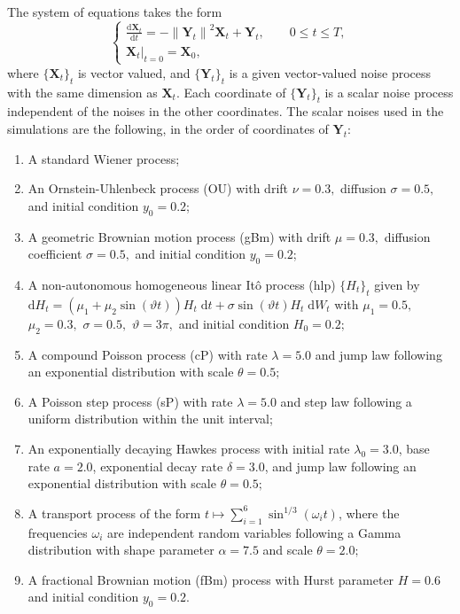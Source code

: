 \documentclass[reqno,12pt]{amsart}
\theoremstyle{plain} %
\theoremstyle{definition} %
\begin{document}
The system of equations takes the form
\begin{equation}
    \label{allnoisesRODEsystem}
    \begin{cases}
        \displaystyle \frac{\mathrm{d}\mathbf{X}_t}{\mathrm{d} t} = - \left\|\mathbf{Y}_t\right\|^2 \mathbf{X}_t + \mathbf{Y}_t, \qquad 0 \leq t \leq T, \\
        \left. \mathbf{X}_t \right|_{t = 0} = \mathbf{X}_0,
    \end{cases}
\end{equation}
where $\{\mathbf{X}_t\}_t$ is vector valued, and $\{\mathbf{Y}_t\}_t$ is a given vector-valued noise process with the same dimension as $\mathbf{X}_t$. Each coordinate of $\{\mathbf{Y}_t\}_t$ is a scalar noise process independent of the noises in the other coordinates. The scalar noises used in the simulations are the following, in the order of coordinates of $\mathbf{Y}_t$:
\begin{enumerate}
    \item A standard Wiener process;
    \item An Ornstein-Uhlenbeck process (OU) with drift $\nu = 0.3,$ diffusion $\sigma = 0.5,$ and initial condition $y_0 = 0.2$;
    \item A geometric Brownian motion process (gBm) with drift $\mu = 0.3,$ diffusion coefficient $\sigma = 0.5,$ and initial condition $y_0 = 0.2$;
    \item A non-autonomous homogeneous linear It\^o process (hlp) $\{H_t\}_t$ given by $\mathrm{d}H_t = (\mu_1 + \mu_2\sin(\vartheta t))H_t\;\mathrm{d}t + \sigma\sin(\vartheta t)H_t\;\mathrm{d}W_t$ with $\mu_1 = 0.5,$ $\mu_2 = 0.3,$ $\sigma = 0.5,$ $\vartheta=3\pi,$ and initial condition $H_0 = 0.2;$
    \item A compound Poisson process (cP) with rate $\lambda = 5.0$ and jump law following an exponential distribution with scale $\theta = 0.5;$
    \item A Poisson step process (sP) with rate $\lambda = 5.0$ and step law following a uniform distribution within the unit interval;
    \item An exponentially decaying Hawkes process with initial rate $\lambda_0 = 3.0$, base rate $a = 2.0$, exponential decay rate $\delta = 3.0$, and jump law following an exponential distribution with scale $\theta = 0.5;$
    \item A transport process of the form $t \mapsto \sum_{i=1}^{6} \sin^{1/3}(\omega_i t)$, where the frequencies $\omega_i$ are independent random variables following a Gamma distribution with shape parameter $\alpha = 7.5$ and scale $\theta = 2.0;$
    \item A fractional Brownian motion (fBm) process with Hurst parameter $H=0.6$ and initial condition $y_0 = 0.2$.
\end{enumerate}
\end{document}
